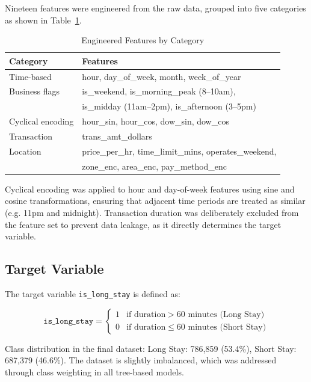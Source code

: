 \documentclass[12pt, a4paper]{article}
\begin{document}
Nineteen features were engineered from the raw data, grouped into
five categories as shown in Table~\ref{tab:features}.

\begin{table}[H]
\centering
\caption{Engineered Features by Category}
\label{tab:features}
\begin{tabular}{@{}ll@{}}
\toprule
\textbf{Category} & \textbf{Features} \\
\midrule
Time-based        & hour, day\_of\_week, month, week\_of\_year \\
Business flags    & is\_weekend, is\_morning\_peak (8--10am), \\
                  & is\_midday (11am--2pm), is\_afternoon (3--5pm) \\
Cyclical encoding & hour\_sin, hour\_cos, dow\_sin, dow\_cos \\
Transaction       & trans\_amt\_dollars \\
Location          & price\_per\_hr, time\_limit\_mins, operates\_weekend, \\
                  & zone\_enc, area\_enc, pay\_method\_enc \\
\bottomrule
\end{tabular}
\end{table}

Cyclical encoding was applied to hour and day-of-week features using
sine and cosine transformations, ensuring that adjacent time periods
are treated as similar (e.g. 11pm and midnight). Transaction duration
was deliberately excluded from the feature set to prevent data leakage,
as it directly determines the target variable.

\subsection{Target Variable}

The target variable \texttt{is\_long\_stay} is defined as:

\begin{equation}
\texttt{is\_long\_stay} =
\begin{cases}
1 & \text{if duration} > 60 \text{ minutes (Long Stay)} \\
0 & \text{if duration} \leq 60 \text{ minutes (Short Stay)}
\end{cases}
\end{equation}

Class distribution in the final dataset: Long Stay: 786,859 (53.4\%),
Short Stay: 687,379 (46.6\%). The dataset is slightly imbalanced,
which was addressed through class weighting in all tree-based models.
\end{document}
